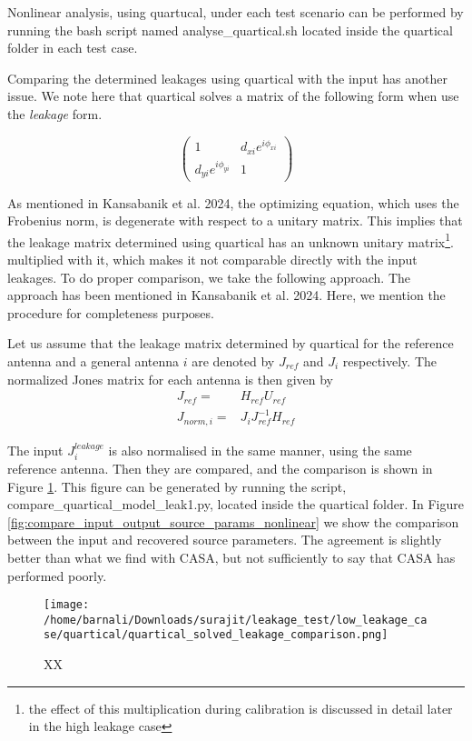 \documentclass{article}
\begin{document}
Nonlinear analysis, using quartucal, under each test scenario can be performed by running the bash script named analyse\_quartical.sh located inside the quartical folder in each test case. 

Comparing the determined leakages using quartical with the input has another issue. We note here that quartical solves a matrix of the following form when use the {\it{leakage}} form.

$$
\begin{pmatrix}
1 & d_{xi}e^{i\phi_{xi}} \\
d_{yi}e^{i\phi_{yi}} & 1 
\end{pmatrix}
$$

 As mentioned in Kansabanik et al. 2024, the optimizing equation, which uses the Frobenius norm, is degenerate with respect to a unitary matrix. This implies that the leakage matrix determined using quartical has an unknown unitary matrix\footnote{the effect of this multiplication during calibration is discussed in detail later in the high leakage case}. multiplied with it, which makes it not comparable directly with the input leakages. To do proper comparison, we take the following approach. The approach has been mentioned in Kansabanik et al. 2024. Here, we mention the procedure for completeness purposes.

Let us assume that the leakage matrix determined by quartical for the reference antenna and a general antenna $i$ are denoted by $J_{ref}$ and $J_i$ respectively. The normalized Jones matrix for each antenna is then given by 
\begin{align}
J_{ref}=&H_{ref}U_{ref}\\
J_{norm,i}=&J_i J_{ref}^{-1}H_{ref}
\end{align}

The input $J^{leakage}_i$ is also normalised in the same manner, using the same reference antenna. Then they are compared, and the comparison is shown in Figure \ref{fig:nonlinear_quartical_leak_comparison}. This figure can be generated by running the script, compare\_quartical\_model\_leak1.py, located inside the quartical folder. In Figure \ref{fig:compare_input_output_source_params_nonlinear} we show the comparison between the input and recovered source parameters. The agreement is slightly better than what we find with CASA, but not sufficiently to say that CASA has performed poorly.

\begin{figure}
\centering
\texttt{[image: /home/barnali/Downloads/surajit/leakage\_test/low\_leakage\_case/quartical/quartical\_solved\_leakage\_comparison.png]}
\caption{XX}
\label{fig:nonlinear_quartical_leak_comparison}
\end{figure}
\end{document}

